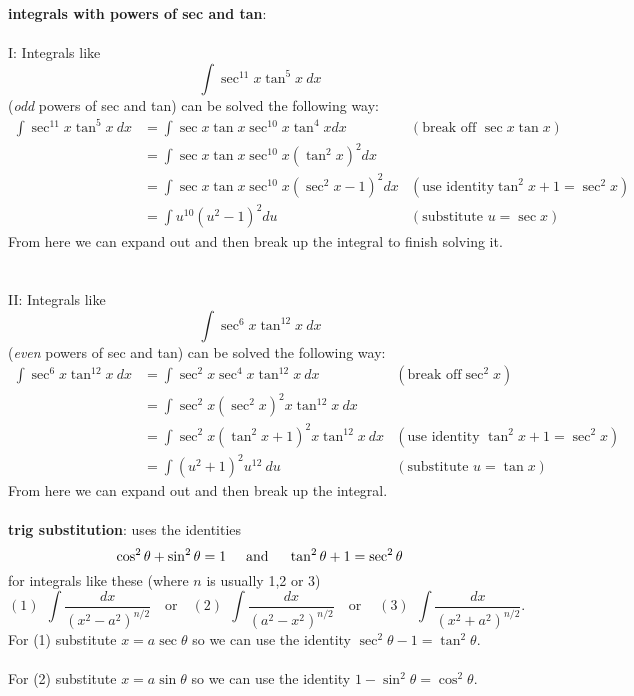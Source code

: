 \documentclass{article}
\begin{document}
\noindent \textbf{integrals with powers of sec and tan}: \\ \\
\noindent I: Integrals like 
$$
\int \sec^{11} x \tan^5 x \: dx
$$
(\textit{odd} powers of sec and tan) can be solved the following way: 
\begin{align*}
    \int \sec^{11} x \tan^5 x \: dx &= \int \sec x \tan x \sec^{10}x \tan^4 x dx &(\text{break off } \sec x \tan x) \\
    &= \int \sec x \tan x \sec^{10}x (\tan^2 x )^2 dx \\
    &=\int \sec x \tan x \sec^{10}x (\sec^2 x -1)^2 dx &(\text{use identity} \tan^2 x + 1 = \sec^2 x) \\
    &= \int u^{10} (u^2-1)^2 du &(\text{substitute } u = \sec x) 
\end{align*}
From here we can expand out and then break up the integral to finish solving it.  \\ \\ \\
II: Integrals like 
$$
\int \sec^6 x \tan^{12} x \: dx 
$$
(\textit{even} powers of sec and tan) can be solved the following way: 
\begin{align*}
    \int \sec^6 x \tan^{12} x \: dx &= \int \sec^2 x \sec^4 x \tan^{12}x \: dx &(\text{break off} \sec^2 x) \\
    &= \int \sec^2 x (\sec^2 x )^2 x \tan^{12}x \: dx \\
    &= \int \sec^2 x (\tan^2 x + 1 )^2 x \tan^{12}x \: dx &(\text{use identity } \tan^2 x + 1 = \sec^2 x) \\
    &= \int (u^2+1)^2 u^{12}\: du &(\text{substitute } u = \tan x) 
\end{align*}
From here we can expand out and then break up the integral. 
\\ \\
\textbf{trig substitution}: uses the identities
$$
\cos^2\theta + \sin^2\theta = 1 \hspace{0.5cm} \text{and} \hspace{0.5cm} \tan^2\theta + 1 = \sec^2\theta
$$
for integrals like these (where $n$ is usually 1,2 or 3)
$$
(1) \:\: \int \frac{dx}{(x^2 - a^2)^{n/2}} \:\:\: \text{ or } \:\:\: (2)\:\: \int \frac{dx}{(a^2-x^2)^{n/2}} \:\:\: \text{ or } \:\:\:\ (3) \:\:\int \frac{dx}{(x^2 + a^2)^{n/2}}. 
$$
For (1) substitute $x = a \sec \theta$ so we can use the identity $\sec^2\theta - 1 = \tan^2\theta$. \\ \\
For (2) substitute $x = a \sin \theta$ so we can use the identity $1-\sin^2\theta = \cos^2\theta$. \\ \\
\end{document}
